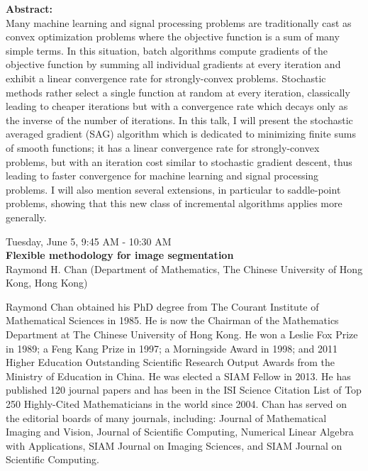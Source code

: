 \textbf{Abstract:}\\

Many machine learning and signal processing problems are traditionally cast as convex optimization problems where the objective function is a sum of many simple terms. In this situation, batch algorithms compute gradients of the objective function by summing all individual gradients at every iteration and exhibit a linear convergence rate for strongly-convex problems. Stochastic methods rather select a single function at random at every iteration, classically leading to cheaper iterations but with a convergence rate which decays only as the inverse of the number of iterations. In this talk, I will present the stochastic averaged gradient (SAG) algorithm which is dedicated to minimizing finite sums of smooth functions; it has a linear convergence rate for strongly-convex problems, but with an iteration cost similar to stochastic gradient descent, thus leading to faster convergence for machine learning and signal processing problems. I will also mention several extensions, in particular to saddle-point problems, showing that this new class of incremental algorithms applies more generally.   


\newpage\vspace{2cm}
\begin{center}{\Large{
      Tuesday, June 5, 9:45 AM - 10:30 AM \\
      \textbf{Flexible methodology for image segmentation}\\
      Raymond H. Chan (Department of Mathematics, The Chinese University of Hong Kong,  Hong Kong)  
}}
\end{center}
\vspace{1cm}

\begin{wrapfloat}{figure}{o}{0pt}
  \texttt{[image: \{images/speakers/rchan@math.cuhk.edu.hk]}.jpg}
\end{wrapfloat}

Raymond Chan obtained his PhD degree from The Courant Institute of Mathematical Sciences in 1985. He is now the Chairman of the Mathematics Department at The Chinese University of Hong Kong. He won a Leslie Fox Prize in 1989; a Feng Kang Prize in 1997; a Morningside Award in 1998; and 2011 Higher Education Outstanding Scientific Research Output Awards from the Ministry of Education in China. He was elected a SIAM Fellow in 2013. He has published 120 journal papers and has been in the ISI Science Citation List of Top 250 Highly-Cited Mathematicians in the world since 2004. Chan has served on the editorial boards of many journals, including: Journal of Mathematical Imaging and Vision, Journal of Scientific Computing, Numerical Linear Algebra with Applications, SIAM Journal on Imaging Sciences, and SIAM Journal on Scientific Computing.   
\\\\

